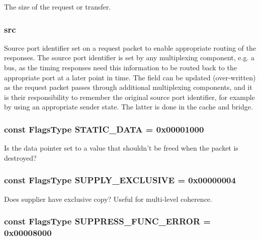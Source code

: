 The size of the request or transfer. \hypertarget{classPacket_ae47dce578a23ce59793947e009b087e3}{
\subsubsection[{src}]{ {\bf src}}}
\label{classPacket_ae47dce578a23ce59793947e009b087e3}
Source port identifier set on a request packet to enable appropriate routing of the responses. The source port identifier is set by any multiplexing component, e.g. a bus, as the timing responses need this information to be routed back to the appropriate port at a later point in time. The field can be updated (over-\/written) as the request packet passes through additional multiplexing components, and it is their responsibility to remember the original source port identifier, for example by using an appropriate sender state. The latter is done in the cache and bridge. \hypertarget{classPacket_a1736ff591124f446ce3ddbb16fb3f505}{
\subsubsection[{STATIC\_\-DATA}]{\setlength{\rightskip}{0pt plus 5cm}const {\bf FlagsType} {\bf STATIC\_\-DATA} = 0x00001000}}
\label{classPacket_a1736ff591124f446ce3ddbb16fb3f505}
Is the data pointer set to a value that shouldn't be freed when the packet is destroyed? \hypertarget{classPacket_a064f460e5a6ed3522adc424c5d31646a}{
\subsubsection[{SUPPLY\_\-EXCLUSIVE}]{\setlength{\rightskip}{0pt plus 5cm}const {\bf FlagsType} {\bf SUPPLY\_\-EXCLUSIVE} = 0x00000004}}
\label{classPacket_a064f460e5a6ed3522adc424c5d31646a}
Does supplier have exclusive copy? Useful for multi-\/level coherence. \hypertarget{classPacket_a5e3b50f943fac776d71dbe3ff03cc7a5}{
\subsubsection[{SUPPRESS\_\-FUNC\_\-ERROR}]{\setlength{\rightskip}{0pt plus 5cm}const {\bf FlagsType} {\bf SUPPRESS\_\-FUNC\_\-ERROR} = 0x00008000}}
